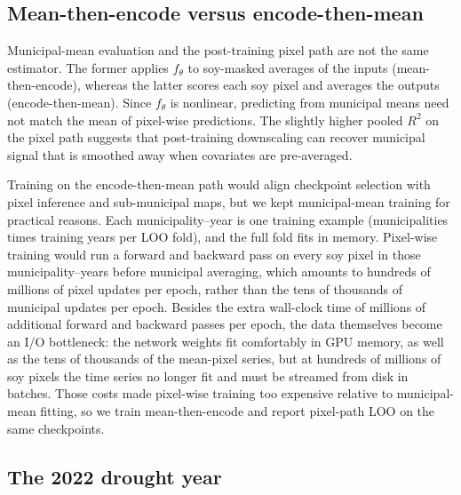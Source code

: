 \subsection{Mean-then-encode versus encode-then-mean}
\label{sec:discussion-mean-vs-pixel}

Municipal-mean evaluation and the post-training pixel path are not the same estimator.
The former applies $f_\theta$ to soy-masked averages of the inputs (mean-then-encode), whereas the latter scores each soy pixel and averages the outputs (encode-then-mean).
Since $f_\theta$ is nonlinear, predicting from municipal means need not match the mean of pixel-wise predictions.
The slightly higher pooled $R^2$ on the pixel path suggests that post-training downscaling can recover municipal signal that is smoothed away when covariates are pre-averaged.

Training on the encode-then-mean path would align checkpoint selection with pixel inference and sub-municipal maps, but we kept municipal-mean training for practical reasons.
Each municipality--year is one training example (municipalities times training years per LOO fold), and the full fold fits in memory.
Pixel-wise training would run a forward and backward pass on every soy pixel in those municipality--years before municipal averaging, which amounts to hundreds of millions of pixel updates per epoch, rather than the tens of thousands of municipal updates per epoch.
Besides the extra wall-clock time of millions of additional forward and backward passes per epoch, the data themselves become an I/O bottleneck: the network weights fit comfortably in GPU memory, as well as the tens of thousands of the mean-pixel series, but at hundreds of millions of soy pixels the time series no longer fit and must be streamed from disk in batches.
Those costs made pixel-wise training too expensive relative to municipal-mean fitting, so we train mean-then-encode and report pixel-path LOO on the same checkpoints.

\subsection{The 2022 drought year}
\label{sec:discussion-drought-2022}

